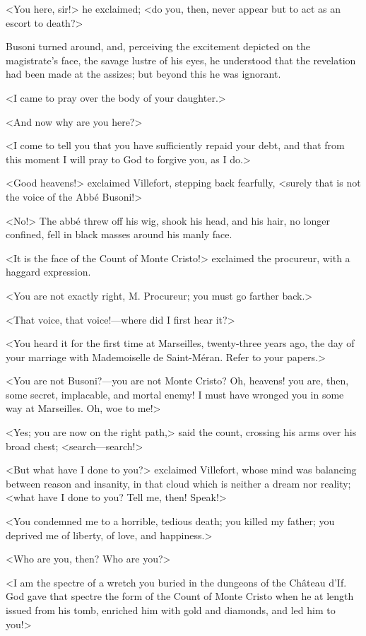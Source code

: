  <You here, sir!> he exclaimed; <do you, then, never appear but to act as an escort to death?> 

 Busoni turned around, and, perceiving the excitement depicted on the magistrate's face, the savage lustre of his eyes, he understood that the revelation had been made at the assizes; but beyond this he was ignorant. 

 <I came to pray over the body of your daughter.> 

 <And now why are you here?> 

 <I come to tell you that you have sufficiently repaid your debt, and that from this moment I will pray to God to forgive you, as I do.> 

 <Good heavens!> exclaimed Villefort, stepping back fearfully, <surely that is not the voice of the Abbé Busoni!> 

 <No!> The abbé threw off his wig, shook his head, and his hair, no longer confined, fell in black masses around his manly face. 

 <It is the face of the Count of Monte Cristo!> exclaimed the procureur, with a haggard expression. 

 <You are not exactly right, M. Procureur; you must go farther back.> 

 <That voice, that voice!—where did I first hear it?> 

 <You heard it for the first time at Marseilles, twenty-three years ago, the day of your marriage with Mademoiselle de Saint-Méran. Refer to your papers.> 

 <You are not Busoni?—you are not Monte Cristo? Oh, heavens! you are, then, some secret, implacable, and mortal enemy! I must have wronged you in some way at Marseilles. Oh, woe to me!> 

 <Yes; you are now on the right path,> said the count, crossing his arms over his broad chest; <search—search!> 

 <But what have I done to you?> exclaimed Villefort, whose mind was balancing between reason and insanity, in that cloud which is neither a dream nor reality; <what have I done to you? Tell me, then! Speak!> 

 <You condemned me to a horrible, tedious death; you killed my father; you deprived me of liberty, of love, and happiness.> 

 <Who are you, then? Who are you?> 

 <I am the spectre of a wretch you buried in the dungeons of the Château d'If. God gave that spectre the form of the Count of Monte Cristo when he at length issued from his tomb, enriched him with gold and diamonds, and led him to you!> 

